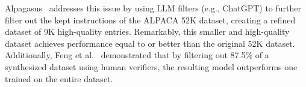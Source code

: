 Alpagasus~\cite{alpagasus} addresses this issue 
by using LLM filters (e.g., ChatGPT)
to further filter out the kept instructions of the ALPACA 52K dataset,
creating a refined dataset of 9K high-quality entries. 
Remarkably, this smaller and high-quality
dataset achieves performance equal to or better than the original 52K dataset.
Additionally, Feng et al.~\cite{modelcollapse1} demonstrated that by
filtering out 87.5\% of a synthesized dataset using human verifiers, the resulting
model outperforms one trained on the entire dataset.

\begin{comment}
\sj{(아래 문장의 경우 이전 설명과 많이 겹쳐서 특별히 필요 없을 듯 합니다.
대신에 Fig. 2를 다를 위치에 넣어서 과도한 API invocation 문제는 언급해야할 듯 합니다.)}
\fixme{
Moreover, the ROUGE-L similarity-based data filtering process of 
the Self-Instruct methodology also involves an excessive number of ChatGPT 
API requests. This filtering process adds a new instruction to the task pool only if its ROUGE-L
similarity with any existing instructions is less than 0.7 \review{(the number is
empirically set in Self-Instruct).} While this approach effectively encourages
diversity, it results in the elimination of over half of the generated instructions.
\FIG{fig:api-inefficiency} illustrates the actual number of generated data
points over time compared to the number of ChatGPT API requests made. Initially,
most of the generated instructions are kept. However, as the number of existing
instructions increases, more than half of the new instructions are filtered out.
This trend becomes increasingly severe as the amount of data grows, highlighting
inefficiencies within the filtering process. Consequently, this inefficiency
leads to high resource and cost consumption.
}
\end{comment}